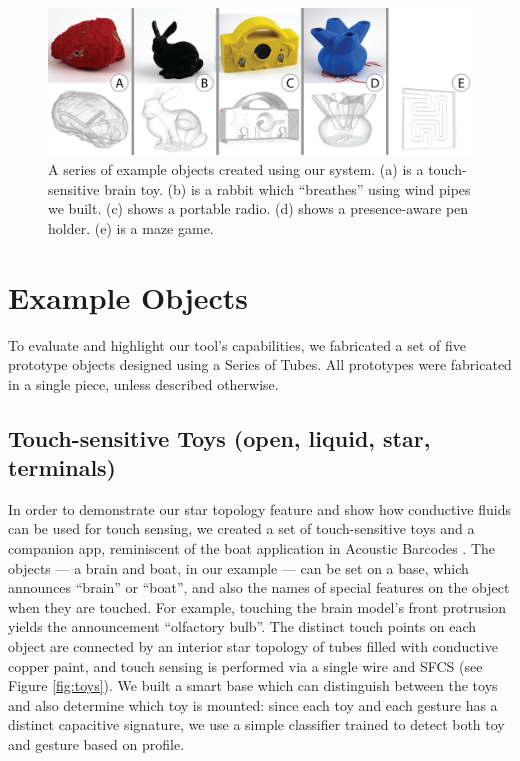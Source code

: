 \begin{figure}
\centering
    \includegraphics[width=7in]{figures/examples.png}
\caption{A series of example objects created using our system.  (a) is a touch-sensitive brain toy.  (b) is a rabbit which ``breathes'' using wind pipes we built.  (c) shows a portable radio.  (d) shows a presence-aware pen holder.  (e) is a maze game.}
\label{fig:examples}
\end{figure}

\section{Example Objects}

To evaluate and highlight our tool's capabilities, we fabricated a set of five prototype objects designed using a Series of Tubes.  All prototypes were fabricated in a single piece, unless described otherwise.

\subsection{Touch-sensitive Toys (open, liquid, star, terminals)}

In order to demonstrate our star topology feature and show how conductive fluids can be used for touch sensing, we created a set of touch-sensitive toys and a companion app, reminiscent of the boat application in Acoustic Barcodes \cite{Harrison-acoustic}. The objects --- a brain and boat, in our example --- can be set on a base, which announces ``brain'' or ``boat'', and also the names of special features on the object when they are touched. For example, touching the brain model's front protrusion yields the announcement ``olfactory bulb''. The distinct touch points on each object are connected by an interior star topology of tubes filled with conductive copper paint, and touch sensing is performed via a single wire and SFCS (see Figure \ref{fig:toys}).  We built a smart base which can distinguish between the toys and also determine which toy is mounted: since each toy and each gesture has a distinct capacitive signature, we use a simple classifier trained to detect both toy and gesture based on profile.

